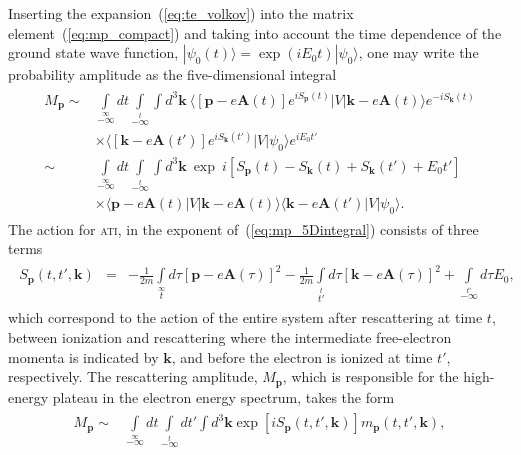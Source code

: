 Inserting the expansion~(\ref{eq:te_volkov}) into the matrix
element~(\ref{eq:mp_compact}) and taking into account the time
dependence of the ground state wave function, $|\psi_{0}(t) \rangle =
\exp{(iE_{0}t)} | \psi_{0} \rangle$, one may write the probability
amplitude as the five-dimensional integral~\cite{KopoldOptComm2000}
%
\begin{eqnarray}
  \label{eq:mp_5Dintegral}
  \begin{split}
    M_{\mathbf{p}} \sim & \int\limits_{-\infty}\limits^{\infty} dt
    \int\limits_{-\infty}\limits^{t} \int d^{3}\mathbf{k}\ 
    \langle [\mathbf{p} - e\mathbf{A}(t)] e^{iS_{\mathbf{p}}(t)} | V |
    \mathbf{k} - e\mathbf{A}(t) \rangle e^{-iS_{\mathbf{k}}(t)} \\
    & \times
    \langle [\mathbf{k} - e\mathbf{A}(t')] e^{iS_{\mathbf{k}}(t')} | V |
    \psi_{0} \rangle e^{iE_{0}t'} \\
    \sim &
    \int\limits_{-\infty}\limits^{\infty} dt
    \int\limits_{-\infty}\limits^{t} \int d^{3}\mathbf{k}\ 
    \exp\ i\left[ S_{\mathbf{p}}(t) - S_{\mathbf{k}}(t)
      + S_{\mathbf{k}}(t') + E_{0}t' \right] \\
    & \times
    \langle \mathbf{p} - e\mathbf{A}(t) | V |
    \mathbf{k} - e\mathbf{A}(t) \rangle 
    \langle \mathbf{k} - e\mathbf{A}(t') | V |
    \psi_{0} \rangle.
  \end{split}
\end{eqnarray}
%
The action for \textsc{ati}, in the exponent
of~(\ref{eq:mp_5Dintegral}) consists of three terms
%
\begin{eqnarray}
  \label{eq:action_mpintegral}
  \begin{split}
    S_{\mathbf{p}}(t, t', \mathbf{k}) & = & - \frac{1}{2m}
    \int\limits_{t}\limits^{\infty} d\tau [\mathbf{p} - e\mathbf{A}(\tau)]^{2}
    - \frac{1}{2m} \int\limits_{t'}\limits^{t} d\tau [\mathbf{k} - e\mathbf{A}(\tau)]^{2}
    + \int\limits_{-\infty}\limits^{t'} d\tau E_{0},
  \end{split}
\end{eqnarray}
%
which correspond to the action of the entire system after rescattering
at time $t$, between ionization and rescattering where the
intermediate free-electron momenta is indicated by $\mathbf{k}$, and
before the electron is ionized at time $t'$, respectively. The
rescattering amplitude, $M_{\mathbf{p}}$, which is responsible for the
high-energy plateau in the electron energy spectrum, takes the
form~\cite{Becker_ati2002,BeckerTEOp_2006}
%
\begin{eqnarray}
\label{eq:mp_final}
\begin{split}
M_{\mathbf{p}} \sim &
\int\limits_{-\infty}\limits^{\infty} dt
\int\limits_{-\infty}\limits^{t} dt'
\int d^{3}\mathbf{k} \exp \left[ iS_{\mathbf{p}}(t, t', \mathbf{k}) \right]
m_{\mathbf{p}}(t, t', \mathbf{k}),
\end{split}
\end{eqnarray}
